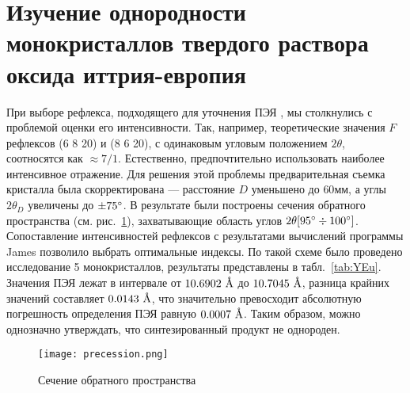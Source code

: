 \section{Изучение однородности монокристаллов твердого раствора оксида иттрия-европия}

При выборе рефлекса, подходящего для уточнения ПЭЯ \YEu{}, мы столкнулись с проблемой оценки его интенсивности.
Так, например, теоретические значения $F$ рефлексов \hkl(6 8 20) и \hkl(8 6 20), с одинаковым угловым положением $2\theta$, соотносятся как $\approx 7/1$.
Естественно, предпочтительно использовать наиболее интенсивное отражение.
Для решения этой проблемы предварительная съемка кристалла была скорректирована --- расстояние $D$ уменьшено до $60\unit{мм}$, а углы $2\theta_D$ увеличены до $\pm 75^\circ$.
В результате были построены сечения обратного пространства (см. рис.~\ref{fig:precession}), захватывающие область углов $2\theta [95^\circ\div100^\circ]$.
Сопоставление интенсивностей рефлексов с результатами вычислений программы James позволило выбрать оптимальные индексы.
По такой схеме было проведено исследование 5 монокристаллов, результаты представлены в табл.~\ref{tab:YEu}. Значения ПЭЯ лежат в интервале от $10.6902\ \text{\AA}$ до $10.7045\ \text{\AA}$, разница крайних значений составляет $0.0143\ \text{\AA}$, что значительно превосходит абсолютную погрешность определения ПЭЯ равную $0.0007\ \text{\AA}$.
Таким образом, можно однозначно утверждать, что синтезированный продукт не однороден.

\begin{figure}[ht!]
    \centering
    \texttt{[image: precession.png]}
    \caption{Сечение обратного пространства}%
    \label{fig:precession}
\end{figure}

